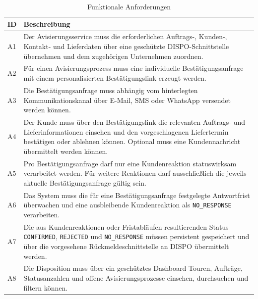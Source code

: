 \begin{table}[htbp]
    \centering
    \caption{Funktionale Anforderungen}
    \label{tab:funktionale-anforderungen}
    \begin{tabularx}{\textwidth}{@{}p{}X@{}}
        \toprule
        ID & Beschreibung \\
        \midrule
        A1 &
        Der Avisierungsservice muss die erforderlichen Auftrags-,
        Kunden-, Kontakt- und Lieferdaten über eine geschützte
        DISPO-Schnittstelle übernehmen und dem zugehörigen Unternehmen
        zuordnen. \\

        A2 &
        Für einen Avisierungsprozess muss eine individuelle
        Bestätigungsanfrage mit einem personalisierten
        Bestätigungslink erzeugt werden. \\

        A3 &
        Die Bestätigungsanfrage muss abhängig vom hinterlegten
        Kommunikationskanal über E-Mail, SMS oder WhatsApp
        versendet werden können. \\

        A4 &
        Der Kunde muss über den Bestätigungslink die relevanten
        Auftrags- und Lieferinformationen einsehen und den
        vorgeschlagenen Liefertermin bestätigen oder ablehnen
        können. Optional muss eine Kundennachricht übermittelt
        werden können. \\

        A5 &
        Pro Bestätigungsanfrage darf nur eine Kundenreaktion
        statuswirksam verarbeitet werden. Für weitere Reaktionen darf
        ausschließlich die jeweils aktuelle Bestätigungsanfrage gültig
        sein. \\

        A6 &
        Das System muss die für eine Bestätigungsanfrage
        festgelegte Antwortfrist überwachen und eine
        ausbleibende Kundenreaktion als \texttt{NO\_RESPONSE}
        verarbeiten. \\

        A7 &
        Die aus Kundenreaktionen oder Fristabläufen resultierenden
        Status \texttt{CONFIRMED}, \texttt{REJECTED} und
        \texttt{NO\_RESPONSE} müssen persistent gespeichert und über
        die vorgesehene Rückmeldeschnittstelle an DISPO
        übermittelt werden. \\

        A8 &
        Die Disposition muss über ein geschütztes Dashboard
        Touren, Aufträge, Statusanzahlen und offene
        Avisierungsprozesse einsehen, durchsuchen und filtern
        können. \\


\end{tabularx}
\end{table}
